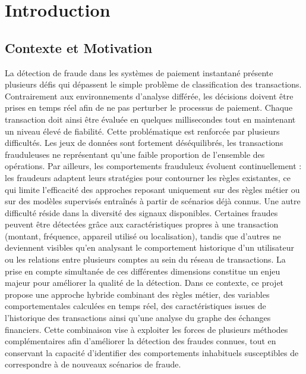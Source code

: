 \documentclass[12pt,a4paper,oneside]{book}
\theoremstyle{definition}
\theoremstyle{plain}
\begin{document}
\listofalgorithms
\cleardoublepage

\mainmatter

\chapter{Introduction}
\label{chap:intro}


\section{Contexte et Motivation}
La détection de fraude dans les systèmes de paiement instantané présente plusieurs défis qui dépassent le simple problème de classification des transactions. Contrairement aux environnements d'analyse différée, les décisions doivent être prises en temps réel afin de ne pas perturber le processus de paiement. Chaque transaction doit ainsi être évaluée en quelques millisecondes tout en maintenant un niveau élevé de fiabilité. Cette problématique est renforcée par plusieurs difficultés. Les jeux de données sont fortement déséquilibrés, les transactions frauduleuses ne représentant qu'une faible proportion de l'ensemble des opérations. Par ailleurs, les comportements frauduleux évoluent continuellement : les fraudeurs adaptent leurs stratégies pour contourner les règles existantes, ce qui limite l'efficacité des approches reposant uniquement sur des règles métier ou sur des modèles supervisés entraînés à partir de scénarios déjà connus. Une autre difficulté réside dans la diversité des signaux disponibles. Certaines fraudes peuvent être détectées grâce aux caractéristiques propres à une transaction (montant, fréquence, appareil utilisé ou localisation), tandis que d'autres ne deviennent visibles qu'en analysant le comportement historique d'un utilisateur ou les relations entre plusieurs comptes au sein du réseau de transactions. La prise en compte simultanée de ces différentes dimensions constitue un enjeu majeur pour améliorer la qualité de la détection. Dans ce contexte, ce projet propose une approche hybride combinant des règles métier, des variables comportementales calculées en temps réel, des caractéristiques issues de l'historique des transactions ainsi qu'une analyse du graphe des échanges financiers. Cette combinaison vise à exploiter les forces de plusieurs méthodes complémentaires afin d'améliorer la détection des fraudes connues, tout en conservant la capacité d'identifier des comportements inhabituels susceptibles de correspondre à de nouveaux scénarios de fraude.
\end{document}

